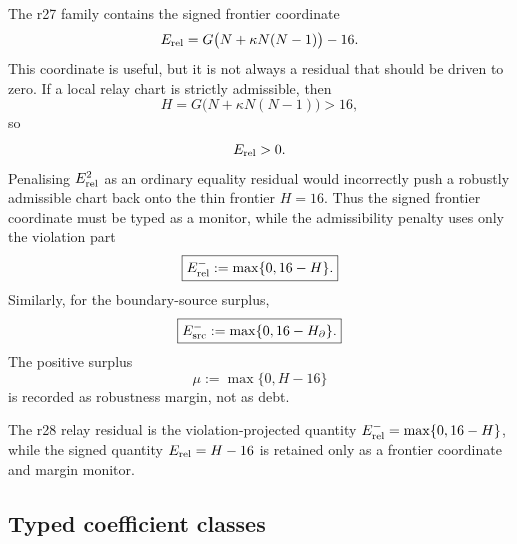 The r27 family contains the signed frontier coordinate
\[
E_{\rm rel}=G\bigl(N+\kappa N(N-1)\bigr)-16.
\]
This coordinate is useful, but it is not always a residual that should be driven
to zero.  If a local relay chart is strictly admissible, then
\[
H=G\bigl(N+\kappa N(N-1)\bigr)>16,
\]
so
\[
E_{\rm rel}>0.
\]
Penalising \(E_{\rm rel}^2\) as an ordinary equality residual would incorrectly
push a robustly admissible chart back onto the thin frontier \(H=16\).  Thus the
signed frontier coordinate must be typed as a monitor, while the admissibility
penalty uses only the violation part
\[
\boxed{
E_{\rm rel}^{-}:=\max\{0,16-H\}.
}
\]
Similarly, for the boundary-source surplus,
\[
\boxed{
E_{\rm src}^{-}:=\max\{0,16-H_{\partial}\}.
}
\]
The positive surplus
\[
\mu:=\max\{0,H-16\}
\]
is recorded as robustness margin, not as debt.

\begin{definition}
\label{def:v470-r28-violation-projected-relay-residual}
The r28 relay residual is the violation-projected quantity
\(E_{\rm rel}^{-}=\max\{0,16-H\}\), while the signed quantity
\(E_{\rm rel}=H-16\) is retained only as a frontier coordinate and margin
monitor.
\end{definition}

\subsection{Typed coefficient classes}
\label{subsec:v470-r28-typed-coefficient-classes}

